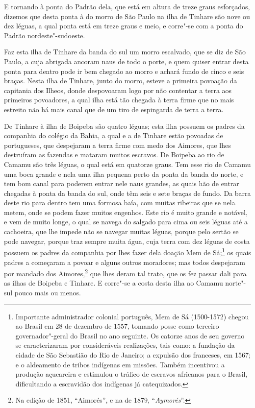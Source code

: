 \begin{linenumbers}
E tornando à ponta do Padrão dela, que está em altura de treze graus esforçados, dizemos
que desta ponta à do morro de São Paulo na ilha de Tinhare são nove ou dez léguas, a qual
ponta está em treze graus e meio, e corre"-se com a ponta do Padrão nordeste"-sudoeste.

Faz esta ilha de Tinhare da banda do sul um morro escalvado, que se diz de São Paulo, a
cuja abrigada ancoram naus de todo o porte, e quem quiser entrar desta ponta para dentro
pode ir bem chegado ao morro e achará fundo de cinco e seis braças. Nesta ilha de Tinhare,
junto do morro, esteve a primeira povoação da capitania dos Ilheos, donde despovoaram logo
por não contentar a terra aos primeiros povoadores, a qual ilha está tão chegada à terra
firme que no mais estreito não há mais canal que de um tiro de espingarda de terra a
terra.

De Tinhare à ilha de Boipeba são quatro léguas; esta ilha possuem os padres da companhia
do colégio da Bahia, a qual e a de Tinhare estão povoadas de portugueses, que despejaram a
terra firme com medo dos Aimores, que lhes destruíram as fazendas e mataram muitos
escravos. De Boipeba ao rio de Camamu são três léguas, o qual está em quatorze graus. Tem
esse rio de Camamu uma boca grande e nela uma ilha pequena perto da ponta da banda do
norte, e tem bom canal para poderem entrar nele naus grandes, as quais hão de entrar
chegadas à ponta da banda do sul, onde têm seis e sete braças de fundo. Da barra deste rio
para dentro tem uma formosa baía, com muitas ribeiras que se nela metem, onde se podem
fazer muitos engenhos. Este rio é muito grande e notável, e vem de muito longe, o qual se
navega do salgado para cima ou seis léguas até a cachoeira, que lhe impede não se navegar
muitas léguas, porque pelo sertão se pode navegar, porque traz sempre muita água, cuja
terra com dez léguas de costa possuem os padres da companhia por lhes fazer dela doação
Mem de Sá;\footnote{ Importante administrador colonial português, Mem de Sá (1500-1572)
chegou ao Brasil em 28 de dezembro de 1557, tomando posse como terceiro governador"-geral
do Brasil no ano seguinte. Os catorze anos de seu governo se caracterizaram por
consideráveis realizações, tais como: a fundação da cidade de São Sebastião do Rio de
Janeiro; a expulsão dos franceses, em 1567; e o aldeamento de tribos indígenas em missões.
Também incentivou a produção açucareira e estimulou o tráfico de escravos africanos para o
Brasil, dificultando a escravidão dos indígenas já catequizados.} os quais padres a
começaram a povoar e alguns outros moradores; mas todos despejaram por mandado dos
Aimores,\footnote{ Na edição de 1851, ``Aimorés'', e na de 1879, ``\textit{Aymorés}''.}
que lhes deram tal trato, que os fez passar dali para as ilhas de Boipeba e Tinhare. E
corre"-se a costa desta ilha ao Camamu norte"-sul pouco mais ou menos.


\end{linenumbers}
